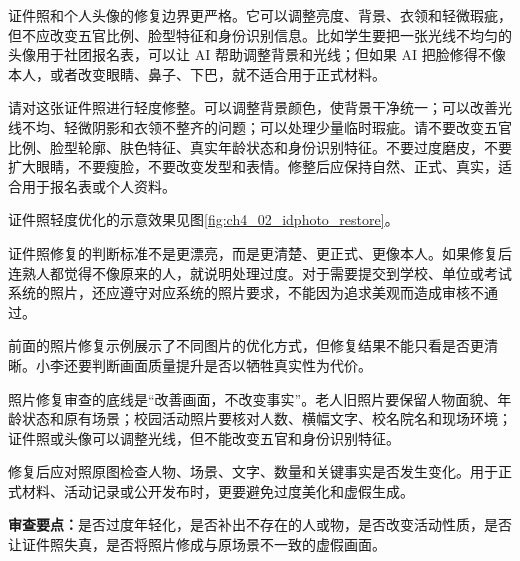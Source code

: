 证件照和个人头像的修复边界更严格。它可以调整亮度、背景、衣领和轻微瑕疵，但不应改变五官比例、脸型特征和身份识别信息。比如学生要把一张光线不均匀的头像用于社团报名表，可以让 AI 帮助调整背景和光线；但如果 AI 把脸修得不像本人，或者改变眼睛、鼻子、下巴，就不适合用于正式材料。

\begin{userbox}
请对这张证件照进行轻度修整。可以调整背景颜色，使背景干净统一；可以改善光线不均、轻微阴影和衣领不整齐的问题；可以处理少量临时瑕疵。请不要改变五官比例、脸型轮廓、肤色特征、真实年龄状态和身份识别特征。不要过度磨皮，不要扩大眼睛，不要瘦脸，不要改变发型和表情。修整后应保持自然、正式、真实，适合用于报名表或个人资料。
\end{userbox}


证件照轻度优化的示意效果见图\ref{fig:ch4_02_idphoto_restore}。

\par\vspace{1em}

\par
\noindent\begin{minipage}{\textwidth}
\centering
{}
\label{fig:ch4_02_idphoto_restore}
\end{minipage}
\par

\par\vspace{1em}

证件照修复的判断标准不是更漂亮，而是更清楚、更正式、更像本人。如果修复后连熟人都觉得不像原来的人，就说明处理过度。对于需要提交到学校、单位或考试系统的照片，还应遵守对应系统的照片要求，不能因为追求美观而造成审核不通过。



前面的照片修复示例展示了不同图片的优化方式，但修复结果不能只看是否更清晰。小李还要判断画面质量提升是否以牺牲真实性为代价。

\begin{critiquebox}
照片修复审查的底线是“改善画面，不改变事实”。老人旧照片要保留人物面貌、年龄状态和原有场景；校园活动照片要核对人数、横幅文字、校名院名和现场环境；证件照或头像可以调整光线，但不能改变五官和身份识别特征。

修复后应对照原图检查人物、场景、文字、数量和关键事实是否发生变化。用于正式材料、活动记录或公开发布时，更要避免过度美化和虚假生成。

\textbf{审查要点：}是否过度年轻化，是否补出不存在的人或物，是否改变活动性质，是否让证件照失真，是否将照片修成与原场景不一致的虚假画面。
\end{critiquebox}


